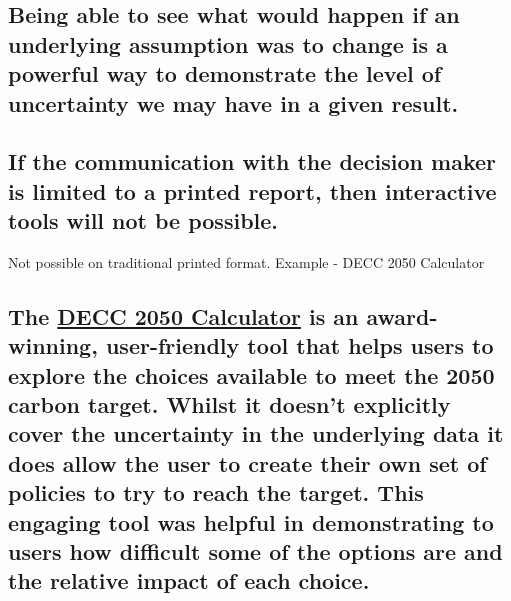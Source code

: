 \documentclass[]{book}
\begin{document}
\subsection{Being able to see what would happen if an underlying
assumption was to change is a powerful way to demonstrate the level of
uncertainty we may have in a given
result.}\label{being-able-to-see-what-would-happen-if-an-underlying-assumption-was-to-change-is-a-powerful-way-to-demonstrate-the-level-of-uncertainty-we-may-have-in-a-given-result.}

\subsection{If the communication with the decision maker is limited to a
printed report, then interactive tools will not be
possible.}\label{if-the-communication-with-the-decision-maker-is-limited-to-a-printed-report-then-interactive-tools-will-not-be-possible.}

 Not possible on traditional printed format. Example - DECC 2050
Calculator

\subsection{\texorpdfstring{The
\href{http://2050-calculator-tool.decc.gov.uk/\#/calculator}{DECC 2050
Calculator} is an award-winning, user-friendly tool that helps users to
explore the choices available to meet the 2050 carbon target. Whilst it
doesn't explicitly cover the uncertainty in the underlying data it does
allow the user to create their own set of policies to try to reach the
target. This engaging tool was helpful in demonstrating to users how
difficult some of the options are and the relative impact of each
choice.}{The DECC 2050 Calculator is an award-winning, user-friendly tool that helps users to explore the choices available to meet the 2050 carbon target. Whilst it doesn't explicitly cover the uncertainty in the underlying data it does allow the user to create their own set of policies to try to reach the target. This engaging tool was helpful in demonstrating to users how difficult some of the options are and the relative impact of each choice.}}\label{the-decc-2050-calculator-is-an-award-winning-user-friendly-tool-that-helps-users-to-explore-the-choices-available-to-meet-the-2050-carbon-target.-whilst-it-doesnt-explicitly-cover-the-uncertainty-in-the-underlying-data-it-does-allow-the-user-to-create-their-own-set-of-policies-to-try-to-reach-the-target.-this-engaging-tool-was-helpful-in-demonstrating-to-users-how-difficult-some-of-the-options-are-and-the-relative-impact-of-each-choice.}


\end{document}
